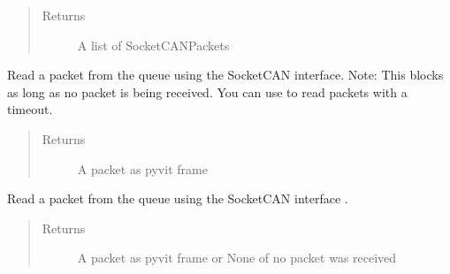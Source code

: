 \documentclass[letterpaper,10pt,english]{sphinxmanual}
\begin{document}
\begin{fulllineitems}
\begin{fulllineitems}
\begin{quote}
\begin{description}
\item[{Returns}] \leavevmode
A list of SocketCANPackets

\end{description}\end{quote}

\end{fulllineitems}


\begin{fulllineitems}
\label{\detokenize{src:src.CANData.CANData.readPacket}}
Read a packet from the queue using the SocketCAN interface.
Note: This blocks as long as no packet is being received.
You can use {\hyperref[\detokenize{src:src.CANData.CANData.readPacketAsync}]{}} to read
packets with a timeout.
\begin{quote}\begin{description}
\item[{Returns}] \leavevmode
A packet as pyvit frame

\end{description}\end{quote}

\end{fulllineitems}


\begin{fulllineitems}
\label{\detokenize{src:src.CANData.CANData.readPacketAsync}}
Read a packet from the queue using the SocketCAN interface .
\begin{quote}\begin{description}
\item[{Returns}] \leavevmode
A packet as pyvit frame or None of no packet was received

\end{description}\end{quote}

\end{fulllineitems}



\end{fulllineitems}
\end{document}
